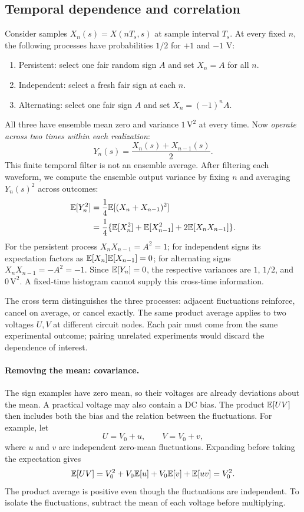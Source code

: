 \subsection{Temporal dependence and correlation}
\label{sec:temporal-dependence}
Consider samples $X_n(s)=X(nT_s,s)$ at sample interval $T_s$. At every fixed $n$, the following processes have probabilities $1/2$ for $+1$ and $-1$ V:
\begin{enumerate}
\item Persistent: select one fair random sign $A$ and set $X_n=A$ for all $n$.
\item Independent: select a fresh fair sign at each $n$.
\item Alternating: select one fair sign $A$ and set $X_n=(-1)^nA$.
\end{enumerate}
All three have ensemble mean zero and variance $1\,\mathrm{V}^2$ at every time. Now \emph{operate across two times within each realization}:
\[
Y_n(s)=\frac{X_n(s)+X_{n-1}(s)}{2}.
\]
This finite temporal filter is not an ensemble average. After filtering each waveform, we compute the ensemble output variance by fixing $n$ and averaging $Y_n(s)^2$ across outcomes:
\begin{align*}
\mathbb E[Y_n^2]
&=\frac14\mathbb E[(X_n+X_{n-1})^2]\\
&=\frac14\{\mathbb E[X_n^2]+\mathbb E[X_{n-1}^2]+2\mathbb E[X_nX_{n-1}]\}.
\end{align*}
For the persistent process $X_nX_{n-1}=A^2=1$; for independent signs its expectation factors as $\mathbb E[X_n]\mathbb E[X_{n-1}]=0$; for alternating signs $X_nX_{n-1}=-A^2=-1$. Since $\mathbb E[Y_n]=0$, the respective variances are $1$, $1/2$, and $0\,\mathrm{V}^2$. A fixed-time histogram cannot supply this cross-time information.
\MarginalFigure

The cross term distinguishes the three processes: adjacent fluctuations reinforce, cancel on average, or cancel exactly. The same product average applies to two voltages $U,V$ at different circuit nodes. Each pair must come from the same experimental outcome; pairing unrelated experiments would discard the dependence of interest.

\paragraph{Removing the mean: covariance.}
The sign examples have zero mean, so their voltages are already deviations about the mean. A practical voltage may also contain a DC bias. The product $\mathbb E[UV]$ then includes both the bias and the relation between the fluctuations. For example, let
\[
U=V_0+u,\qquad V=V_0+v,
\]
where $u$ and $v$ are independent zero-mean fluctuations. Expanding before taking the expectation gives
\[
\mathbb E[UV]=V_0^2+V_0\mathbb E[u]+V_0\mathbb E[v]+\mathbb E[uv]=V_0^2.
\]
The product average is positive even though the fluctuations are independent. To isolate the fluctuations, subtract the mean of each voltage before multiplying.

